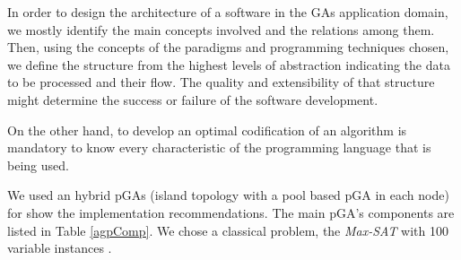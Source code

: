 
\noindent In order to design the architecture of a software in the GAs application domain, we mostly identify the main concepts involved and the relations among them. Then, using the concepts of the paradigms and programming techniques chosen, we define the structure from the highest levels of abstraction indicating the data to be processed and their flow. The quality and extensibility of that structure might determine the success or failure of the software development.

On the other hand, to develop an optimal codification of an algorithm is mandatory to know every characteristic of the programming language that is being used.

We used an hybrid pGAs (island topology with a pool based pGA in each node) for show the implementation recommendations. The main pGA’s components are listed in Table \ref{agpComp}. We chose a classical problem, the {\em Max-SAT} with 100 variable instances \cite{Hoos2000}.


